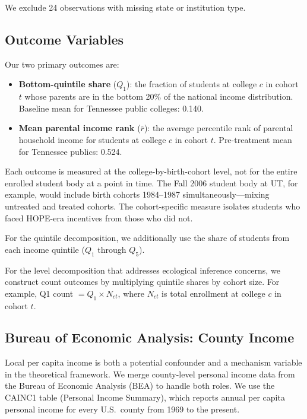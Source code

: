 We exclude 24 observations with missing state or institution type.

\subsection{Outcome Variables}

Our two primary outcomes are:

\begin{itemize}
\item \textbf{Bottom-quintile share} ($Q_1$): the fraction of students
  at college $c$ in cohort $t$ whose parents are in the bottom 20\% of
  the national income distribution. Baseline mean for Tennessee public
  colleges: 0.140.

\item \textbf{Mean parental income rank} ($\overline{r}$): the average
  percentile rank of parental household income for students at college
  $c$ in cohort $t$. Pre-treatment mean for Tennessee publics: 0.524.
\end{itemize}

Each outcome is measured at the college-by-birth-cohort level, not for
the entire enrolled student body at a point in time. The Fall 2006
student body at UT, for example, would include birth cohorts
1984--1987 simultaneously---mixing untreated and treated cohorts. The
cohort-specific measure isolates students who faced HOPE-era
incentives from those who did not.

For the quintile decomposition, we additionally use the share of
students from each income quintile ($Q_1$ through $Q_5$).

For the level decomposition that addresses ecological inference
concerns, we construct count outcomes by multiplying quintile shares by
cohort size. For example, Q1 count $= Q_1 \times N_{ct}$, where
$N_{ct}$ is total enrollment at college $c$ in cohort $t$.

\subsection{Bureau of Economic Analysis: County Income}
\label{sec:data_bea}

Local per capita income is both a potential confounder and a mechanism
variable in the theoretical framework. We merge county-level personal
income data from the Bureau of Economic Analysis (BEA) to handle both
roles. We use the CAINC1 table (Personal Income Summary),
which reports annual per capita personal income for every U.S.\ county
from 1969 to the present.

